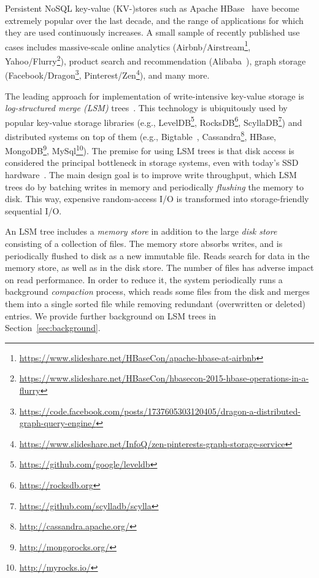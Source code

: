 
Persistent NoSQL key-value (KV-)stores such as Apache HBase~\cite{hbase} have become extremely popular over the last decade, 
and the range of applications for which they are used continuously increases. A small sample of  recently 
published use cases includes massive-scale online analytics (Airbnb/Airstream\footnote{\small{\url{https://www.slideshare.net/HBaseCon/apache-hbase-at-airbnb}}}, 
Yahoo/Flurry\footnote{\small{\url{https://www.slideshare.net/HBaseCon/hbasecon-2015-hbase-operations-in-a-flurry}}}), product search 
and recommendation (Alibaba~\cite{alibabahbase}), 
graph storage (Facebook/Dragon\footnote{\small{\url{https://code.facebook.com/posts/1737605303120405/dragon-a-distributed-graph-query-engine/}}}, 
Pinterest/Zen\footnote{\small{\url{https://www.slideshare.net/InfoQ/zen-pinterests-graph-storage-service}}}), and many more. 

The leading approach for implementation of write-intensive key-value storage is \emph{log-structured merge (LSM)} trees~\cite{O'Neil:1996}.
This technology is ubiquitously used by popular key-value storage libraries (e.g., LevelDB\footnote{\small{\url{https://github.com/google/leveldb}}}, 
RocksDB\footnote{\small{\url{https://rocksdb.org}}}, ScyllaDB\footnote{\small{\url{https://github.com/scylladb/scylla}}}) and distributed systems on top 
of them (e.g., Bigtable~\cite{Chang2008}, Cassandra\footnote{\small{\url{http://cassandra.apache.org/}}}, HBase, 
MongoDB\footnote{\small{\url{http://mongorocks.org/}}}, MySql\footnote{\small{\url{http://myrocks.io/}}}). 
The premise for using LSM trees is that disk access is considered the principal bottleneck in storage systems, even with today's SSD hardware~\cite{rocksdb,Tanenbaum:2014:MOS:2655363,Wu:2012:AWB:2093139.2093140}. 
The main design goal is to improve write throughput, which LSM trees do by batching writes in memory 
and periodically \emph{flushing} the memory  to disk. This way, expensive random-access I/O is transformed 
into storage-friendly sequential I/O. 

An LSM tree includes a \emph{memory store} in addition to the large \emph{disk store} consisting of a collection of files. 
The memory store absorbs writes, and is periodically flushed to disk as a new immutable file. Reads search for  data
in the memory store, as well as in the disk store. The number of files has adverse impact on read performance. 
In order to reduce it, the system periodically runs a background \emph{compaction} process, which reads some files from 
the disk and merges them into a single sorted file while removing redundant (overwritten or deleted) entries.
We provide further background on LSM trees in Section~\ref{sec:background}.

